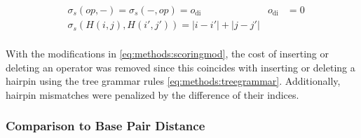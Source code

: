 \documentclass[../../master.tex]{subfiles}
\begin{document}
\begin{equation}\label{eq:methods:scoringmod}
	\begin{aligned}
		&\sigma_s(op, -) = \sigma_s(-, op) = o_{\mathrm{di}} & o_{\mathrm{di}} &= 0 \\
		&\sigma_s(H(i, j), H(i', j')) = |i - i'| + |j - j'| &  & \\
	\end{aligned}
\end{equation}

With the modifications in \autoref{eq:methods:scoringmod}, the cost of inserting or deleting an operator was removed since this coincides with inserting or deleting a hairpin using the tree grammar rules \eqref{eq:methods:treegrammar}.
Additionally, hairpin mismatches were penalized by the difference of their indices.


\subsubsection{Comparison to Base Pair Distance}
\label{sub:appendix:strcomp}
\end{document}
